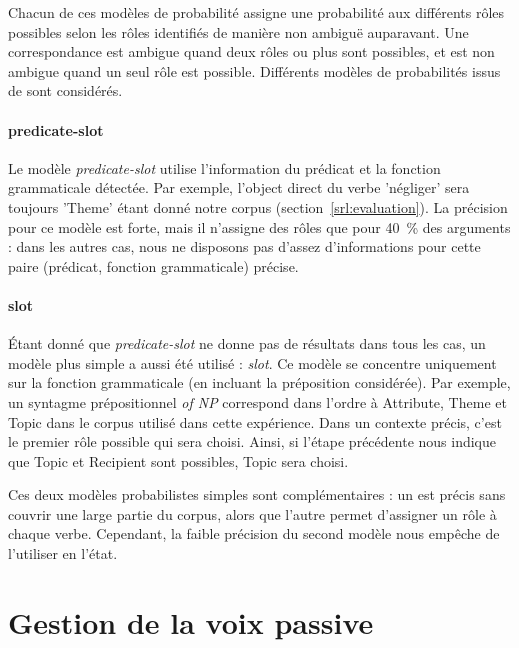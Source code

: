 Chacun de ces modèles de probabilité assigne une probabilité aux différents
rôles possibles selon les rôles identifiés de manière non ambiguë auparavant.
Une correspondance est ambigue quand deux rôles ou plus sont possibles, et est
non ambigue quand un seul rôle est possible. Différents modèles de probabilités
issus de \citep{swier2005exploiting} sont considérés.


\paragraph{predicate-slot}

Le modèle \emph{predicate-slot} utilise l'information du prédicat et la
fonction grammaticale détectée. Par exemple, l'object direct du verbe
'négliger' sera toujours 'Theme' étant donné notre corpus
(section~\ref{srl:evaluation}). La précision pour ce modèle est forte, mais il
n'assigne des rôles que pour 40~\% des arguments : dans les autres cas, nous ne
disposons pas d'assez d'informations pour cette paire (prédicat, fonction
grammaticale) précise.

\paragraph{slot}

Étant donné que \emph{predicate-slot} ne donne pas de résultats dans tous les
cas, un modèle plus simple a aussi été utilisé : \emph{slot}. Ce modèle se
concentre uniquement sur la fonction grammaticale (en incluant la préposition
considérée). Par exemple, un syntagme prépositionnel \emph{of NP} correspond
dans l'ordre à Attribute, Theme et Topic dans le corpus utilisé dans cette
expérience. Dans un contexte précis, c'est le premier rôle possible qui sera
choisi. Ainsi, si l'étape précédente nous indique que Topic et Recipient sont
possibles, Topic sera choisi.

Ces deux modèles probabilistes simples sont complémentaires : un est précis
sans couvrir une large partie du corpus, alors que l'autre permet d'assigner un
rôle à chaque verbe. Cependant, la faible précision du second modèle nous
empêche de l'utiliser en l'état. %

\section{Gestion de la voix passive}

